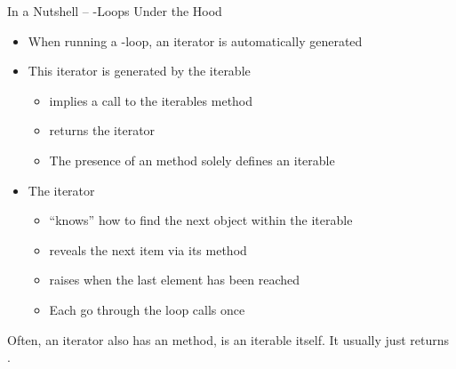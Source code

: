 
\begin{frame}[fragile]{In a Nutshell -- -Loops Under the Hood}
%
\begin{itemize}
\item When running a -loop, an iterator is automatically generated
\item This iterator is generated by the iterable
	\begin{itemize}
	\item {} implies a call to the iterables  method
	\item {} returns the iterator
	\item The presence of an  method solely defines an iterable
	\end{itemize}
\item The iterator
	\begin{itemize}
	\item \enquote{knows} how to find the next object within the iterable
	\item reveals the next item via its  method
	\item raises  when the last element has been reached
	\item Each go through the loop calls  once
	\end{itemize}
\end{itemize}
%
\begin{hintbox}
\footnotesize
Often, an iterator also has an  method, \ie is an iterable itself. It usually just returns .
\end{hintbox}
%
\end{frame}


